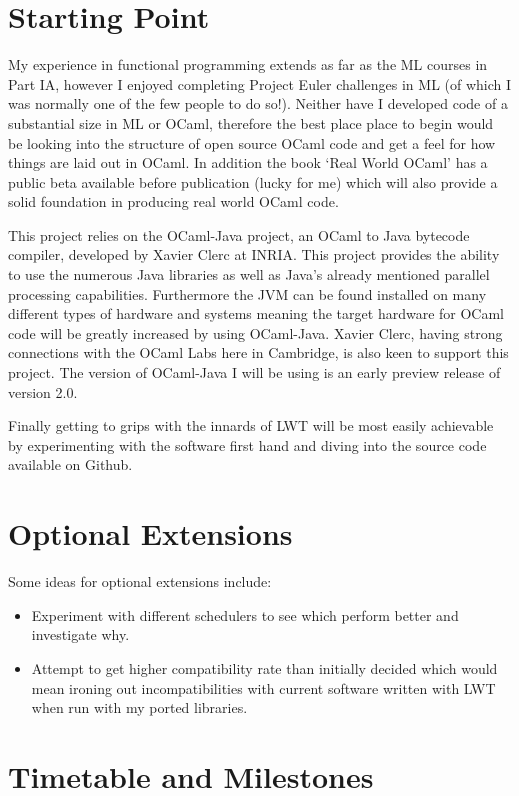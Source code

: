 \section{Starting Point}
\label{sec:starting}
My experience in functional programming extends as far as the ML courses in Part IA, however I enjoyed completing Project Euler challenges in ML (of which I was normally one of the few people to do so!). Neither have I developed code of a substantial size in ML or OCaml, therefore the best place place to begin would be looking into the structure of open source OCaml code and get a feel for how things are laid out in OCaml. In addition the book `Real World OCaml'\cite{madhavapeddy2013} has a public beta available before publication (lucky for me) which will also provide a solid foundation in producing real world OCaml code.

This project relies on the OCaml-Java project, an OCaml to Java bytecode compiler, developed by Xavier Clerc at INRIA. This project provides the ability to use the numerous Java libraries as well as Java's already mentioned parallel processing capabilities. Furthermore the JVM can be found installed on many different types of hardware and systems meaning the target hardware for OCaml code will be greatly increased by using OCaml-Java. Xavier Clerc, having strong connections with the OCaml Labs here in Cambridge, is also keen to support this project. The version of OCaml-Java I will be using is an early preview release of version 2.0.

Finally getting to grips with the innards of LWT will be most easily achievable by experimenting with the software first hand and diving into the source code available on Github.

\section{Optional Extensions}
\label{sec:optional}
Some ideas for optional extensions include:
\begin{itemize}
\item{Experiment with different schedulers to see which perform better and investigate why.}
\item{Attempt to get higher compatibility rate than initially decided which would mean ironing out incompatibilities with current software written with LWT when run with my ported libraries.}
\end{itemize}

\section{Timetable and Milestones}
\label{sec:timetable}

